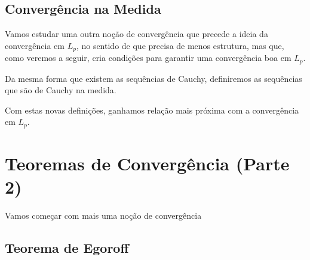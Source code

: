 \dominatedConvergenceLp

\boundedConvergenceLp

\subsection{Convergência na Medida}

Vamos estudar uma outra noção de convergência que precede a ideia da convergência em $L_p$, no sentido de que precisa de menos estrutura, mas que, como veremos a seguir, cria condições para garantir uma convergência boa em $L_p$.

\measureConvergence

Da mesma forma que existem as sequências de Cauchy, definiremos as sequências que são de Cauchy na medida.

\measureCauchyConvergence

Com estas novas definições, ganhamos relação mais próxima com a convergência em $L_p$.

\convergentInLpConvergentInMeasure

\cauchyInMeasure

\cauchyMeasureCorollary

\convergenceInMeasureLpConvergence

\section{Teoremas de Convergência (Parte 2)}

Vamos começar com mais uma noção de convergência

\almostUniformConvergence

\subsection{Teorema de Egoroff}

\almostUniformCauchyLemma

\almostUniformConvergenceProposition

\egoroff


